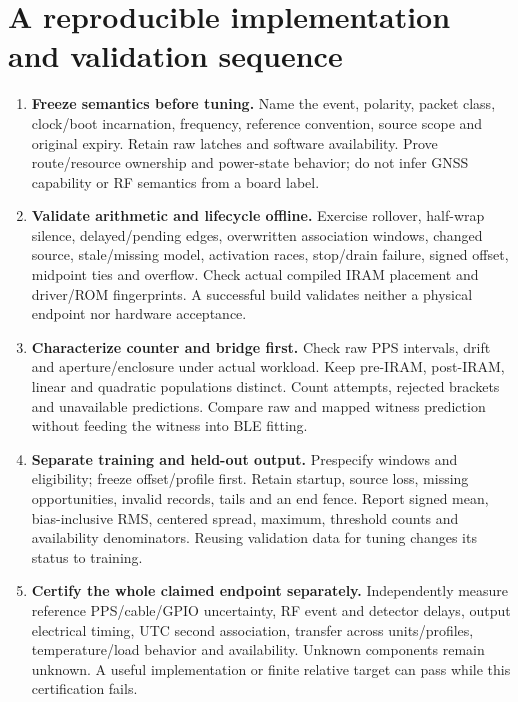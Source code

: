 \documentclass[10pt,letterpaper]{article}
\begin{document}
\section{A reproducible implementation and validation sequence}
\begin{enumerate}
\item \textbf{Freeze semantics before tuning.} Name the event, polarity, packet class, clock/boot incarnation, frequency, reference convention, source scope and original expiry. Retain raw latches and software availability. Prove route/resource ownership and power-state behavior; do not infer GNSS capability or RF semantics from a board label.
\item \textbf{Validate arithmetic and lifecycle offline.} Exercise rollover, half-wrap silence, delayed/pending edges, overwritten association windows, changed source, stale/missing model, activation races, stop/drain failure, signed offset, midpoint ties and overflow. Check actual compiled IRAM placement and driver/ROM fingerprints. A successful build validates neither a physical endpoint nor hardware acceptance.
\item \textbf{Characterize counter and bridge first.} Check raw PPS intervals, drift and aperture/enclosure under actual workload. Keep pre-IRAM, post-IRAM, linear and quadratic populations distinct. Count attempts, rejected brackets and unavailable predictions. Compare raw and mapped witness prediction without feeding the witness into BLE fitting.
\item \textbf{Separate training and held-out output.} Prespecify windows and eligibility; freeze offset/profile first. Retain startup, source loss, missing opportunities, invalid records, tails and an end fence. Report signed mean, bias-inclusive RMS, centered spread, maximum, threshold counts and availability denominators. Reusing validation data for tuning changes its status to training.
\item \textbf{Certify the whole claimed endpoint separately.} Independently measure reference PPS/cable/GPIO uncertainty, RF event and detector delays, output electrical timing, UTC second association, transfer across units/profiles, temperature/load behavior and availability. Unknown components remain unknown. A useful implementation or finite relative target can pass while this certification fails.
\end{enumerate}
\end{document}
